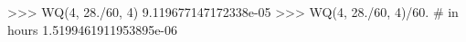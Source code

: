
>>> WQ(4, 28./60, 4)
9.119677147172338e-05
>>> WQ(4, 28./60, 4)/60. # in hours
1.5199461911953895e-06

